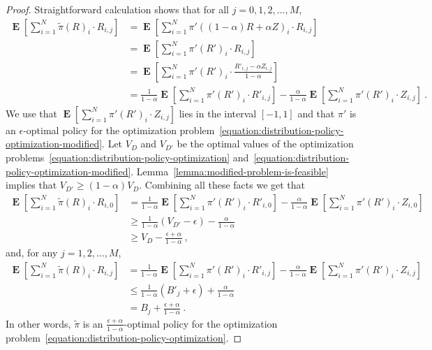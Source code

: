 \documentclass[12pt]{article}
\DeclareMathOperator*{\Exp}{\mathbf{E}}
\theoremstyle{definition}
\begin{document}
\begin{proof}
Straightforward calculation shows that for all $j=0,1,2,\dots,M$,
\begin{align*}
\Exp \left[ \sum_{i=1}^N \widetilde{\pi}(R)_i \cdot R_{i,j} \right]
& = \Exp \left[ \sum_{i=1}^N \pi'((1-\alpha)R + \alpha Z)_i \cdot R_{i,j} \right] \\
& = \Exp \left[ \sum_{i=1}^N \pi'(R')_i \cdot R_{i,j} \right] \\
& = \Exp \left[ \sum_{i=1}^N \pi'(R')_i \cdot \frac{R'_{i,j} - \alpha Z_{i,j}}{1-\alpha} \right] \\
& = \frac{1}{1-\alpha} \Exp \left[ \sum_{i=1}^N \pi'(R')_i \cdot R'_{i,j} \right] -  \frac{\alpha}{1-\alpha} \Exp \left[ \sum_{i=1}^N \pi'(R')_i \cdot Z_{i,j} \right] \: .
\end{align*}
We use that $\Exp \left[ \sum_{i=1}^N \pi'(R')_i \cdot Z_{i,j} \right]$ lies in
the interval $[-1,1]$ and that $\pi'$ is an $\epsilon$-optimal policy
for the optimization
problem~\eqref{equation:distribution-policy-optimization-modified}. Let $V_D$ and
$V_{D'}$ be the optimal values of the optimization
problems~\eqref{equation:distribution-policy-optimization}
and~\eqref{equation:distribution-policy-optimization-modified}.
Lemma~\ref{lemma:modified-problem-is-feasible} implies that $V_{D'} \ge (1 - \alpha)
V_D$. Combining all these facts we get that
\begin{align*}
\Exp \left[ \sum_{i=1}^N \widetilde{\pi}(R)_i \cdot R_{i,0} \right]
& = \frac{1}{1-\alpha} \Exp \left[ \sum_{i=1}^N \pi'(R')_i \cdot R'_{i,0} \right] -  \frac{\alpha}{1-\alpha} \Exp \left[ \sum_{i=1}^N \pi'(R')_i \cdot Z_{i,0} \right] \\
& \ge \frac{1}{1-\alpha} (V_{D'} - \epsilon) - \frac{\alpha}{1-\alpha}   \\
& \ge V_D - \frac{\epsilon + \alpha}{1-\alpha} \: ,
\end{align*}
and, for any $j=1,2,\dots,M$,
\begin{align*}
\Exp \left[ \sum_{i=1}^N \widetilde{\pi}(R)_i \cdot R_{i,j} \right]
& = \frac{1}{1-\alpha} \Exp \left[ \sum_{i=1}^N \pi'(R')_i \cdot R'_{i,j} \right] -  \frac{\alpha}{1-\alpha} \Exp \left[ \sum_{i=1}^N \pi'(R')_i \cdot Z_{i,j} \right] \\
& \le \frac{1}{1-\alpha} (B'_j + \epsilon) + \frac{\alpha}{1-\alpha} \\
& = B_j + \frac{\epsilon + \alpha}{1-\alpha} \: .
\end{align*}
In other words, $\widetilde{\pi}$ is an $\frac{\epsilon + \alpha}{1-\alpha}$-optimal policy for the optimization
problem~\eqref{equation:distribution-policy-optimization}.
\end{proof}
\end{document}

